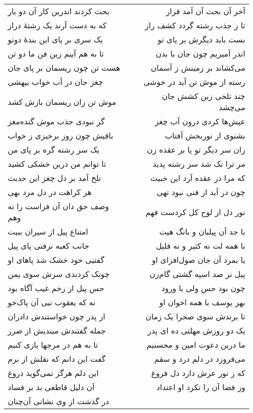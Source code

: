 \begin{center}
\begin{longtable}{l p{0.5cm} r}
بحث کردند اندرین کار آن دو یار
&&
آخر آن بحث آن آمد قرار
\\
که به دست آرند یک رشتهٔ دراز
&&
تا ز جذب رشته گردد کشف راز
\\
یک سری بر پای این بندهٔ دوتو
&&
بست باید دیگرش بر پای تو
\\
تا به هم آییم زین فن ما دو تن
&&
اندر آمیزیم چون جان با بدن
\\
هست تن چون ریسمان بر پای جان
&&
می‌کشاند بر زمینش ز آسمان
\\
چغز جان در آب خواب بیهشی
&&
رسته از موش تن آید در خوشی
\\
موش تن زان ریسمان بازش کشد
&&
چند تلخی زین کشش جان می‌چشد
\\
گر نبودی جذب موش گنده‌مغز
&&
عیش‌ها کردی درون آب چغز
\\
باقیش چون روز برخیزی ز خواب
&&
بشنوی از نوربخش آفتاب
\\
یک سر رشته گره بر پای من
&&
زان سر دیگر تو پا بر عقده زن
\\
تا توانم من درین خشکی کشید
&&
مر ترا نک شد سر رشته پدید
\\
تلخ آمد بر دل چغز این حدیث
&&
که مرا در عقده آرد این خبیث
\\
هر کراهت در دل مرد بهی
&&
چون در آید از فنی نبود تهی
\\
وصف حق دان آن فراست را نه وهم
&&
نور دل از لوح کل کردست فهم
\\
امتناع پیل از سیران ببیت
&&
با جد آن پیلبان و بانگ هیت
\\
جانب کعبه نرفتی پای پیل
&&
با همه لت نه کثیر و نه قلیل
\\
گفتیی خود خشک شد پاهای او
&&
یا بمرد آن جان صول‌افزای او
\\
چونک کردندی سرش سوی یمن
&&
پیل نر صد اسپه گشتی گام‌زن
\\
حس پیل از زخم غیب آگاه بود
&&
چون بود حس ولی با ورود
\\
نه که یعقوب نبی آن پاک‌خو
&&
بهر یوسف با همه اخوان او
\\
از پدر چون خواستندش دادران
&&
تا برندش سوی صحرا یک زمان
\\
جمله گفتندش میندیش از ضرر
&&
یک دو روزش مهلتی ده ای پدر
\\
تا به هم در مرجها بازی کنیم
&&
ما درین دعوت امین و محسنیم
\\
گفت این دانم که نقلش از برم
&&
می‌فروزد در دلم درد و سقم
\\
این دلم هرگز نمی‌گوید دروغ
&&
که ز نور عرش دارد دل فروغ
\\
آن دلیل قاطعی بد بر فساد
&&
وز قضا آن را نکرد او اعتداد
\\
در گذشت از وی نشانی آن‌چنان

\end{longtable}
\end{center}
